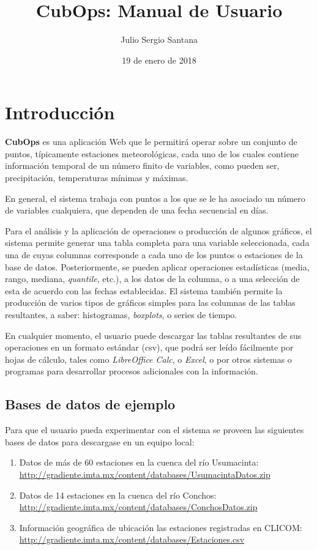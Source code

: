 \documentclass[spanish,]{article}
\title{CubOps: Manual de Usuario}
\author{Julio Sergio Santana}
\date{19 de enero de 2018}
\providecommand{\tightlist}{%
  \setlength{\itemsep}{0pt}\setlength{\parskip}{0pt}}
\begin{document}
\maketitle

{
\setcounter{tocdepth}{2}
\tableofcontents
}
\section{Introducción}\label{introduccion}

\textbf{CubOps} es una aplicación Web que le permitirá operar sobre un
conjunto de puntos, típicamente estaciones meteorológicas, cada uno de
los cuales contiene información temporal de un número finito de
variables, como pueden ser, precipitación, temperaturas mínimas y
máximas.

En general, el sistema trabaja con puntos a los que se le ha asociado un
número de variables cualquiera, que dependen de una fecha secuencial en
días.

Para el análisis y la aplicación de operaciones o producción de algunos
gráficos, el sistema permite generar una tabla completa para una
variable seleccionada, cada una de cuyas columnas corresponde a cada uno
de los puntos o estaciones de la base de datos. Posteriormente, se
pueden aplicar operaciones estadísticas (media, rango, mediana,
\emph{quantile}, etc.), a los datos de la columna, o a una selección de
esta de acuerdo con las fechas establecidas. El sistema también permite
la producción de varios tipos de gráficos simples para las columnas de
las tablas resultantes, a saber: histogramas, \emph{boxplots}, o series
de tiempo.

En cualquier momento, el usuario puede descargar las tablas resultantes
de sus operaciones en un formato estándar (csv), que podrá ser leído
fácilmente por hojas de cálculo, tales como \emph{LibreOffice Calc}, o
\emph{Excel}, o por otros sistemas o programas para desarrollar procesos
adicionales con la información.

\subsection{Bases de datos de ejemplo}\label{bases-de-datos-de-ejemplo}

Para que el usuario pueda experimentar con el sistema se proveen las
siguientes bases de datos para descargase en un equipo local:

\begin{enumerate}
\def\labelenumi{\arabic{enumi}.}
\tightlist
\item
  Datos de más de 60 estaciones en la cuenca del río Usumacinta:
  \url{http://gradiente.imta.mx/content/databases/UsumacintaDatos.zip}
\item
  Datos de 14 estaciones en la cuenca del río Conchos:
  \url{http://gradiente.imta.mx/content/databases/ConchosDatos.zip}
\item
  Información geográfica de ubicación las estaciones registradas en
  CLICOM:
  \url{http://gradiente.imta.mx/content/databases/Estaciones.csv}
\end{enumerate}
\end{document}
